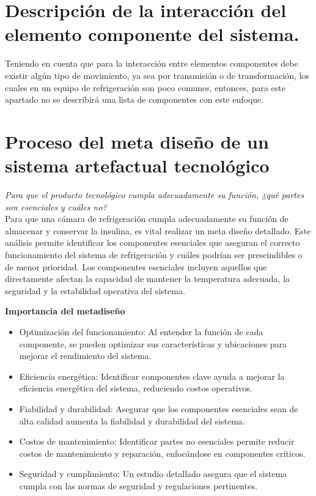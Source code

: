 \newpage
\section{Descripción de la interacción del elemento componente del sistema.}

Teniendo en cuenta que para la interacción entre elementos componentes debe existir algún tipo de movimiento, ya sea por transmisión o de transformación, los cuales en un equipo de refrigeración son poco comunes, entonces, para este apartado no se describirá una lista de componentes con este enfoque.



\section{Proceso del meta diseño de un sistema artefactual tecnológico}

\textit{Para que el producto tecnológico cumpla adecuadamente su función, ¿qué partes son esenciales y cuáles no?}\\


Para que una cámara de refrigeración cumpla adecuadamente su función de almacenar y conservar la insulina, es vital realizar un meta diseño detallado. Este análisis permite identificar los componentes esenciales que aseguran el correcto funcionamiento del sistema de refrigeración y cuáles podrían ser prescindibles o de menor prioridad. Los componentes esenciales incluyen aquellos que directamente afectan la capacidad de mantener la temperatura adecuada, la seguridad y la estabilidad operativa del sistema.

\textbf{Importancia del metadiseño}
\begin{itemize}
	\item Optimización del funcionamiento: Al entender la función de cada componente, se pueden optimizar sus características y ubicaciones para mejorar el rendimiento del sistema.
\item Eficiencia energética: Identificar componentes clave ayuda a mejorar la eficiencia energética del sistema, reduciendo costos operativos.
\item Fiabilidad y durabilidad: Asegurar que los componentes esenciales sean de alta calidad aumenta la fiabilidad y durabilidad del sistema.
\item Costos de mantenimiento: Identificar partes no esenciales permite reducir costos de mantenimiento y reparación, enfocándose en componentes críticos.
\item Seguridad y cumplimiento: Un estudio detallado asegura que el sistema cumpla con las normas de seguridad y regulaciones pertinentes.

\end{itemize}


